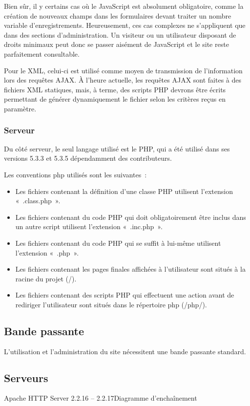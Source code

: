 \documentclass[letter, 11pt]{report}
\begin{document}
Bien sûr, il y certains cas où le JavaScript est absolument obligatoire, comme la création de nouveaux champs dans les formulaires devant traiter un nombre variable d'enregistrements. Heureusement, ces cas complexes ne s'appliquent que dans des sections d'administration. Un visiteur ou un utilisateur disposant de droits minimaux peut donc se passer aisément de JavaScript et le site reste parfaitement consultable.

Pour le XML, celui-ci est utilisé comme moyen de transmission de l'information lors des requêtes AJAX. À l'heure actuelle, les requêtes AJAX sont faites à des fichiers XML statiques, mais, à terme, des scripts PHP devrons être écrits permettant de générer dynamiquement le fichier selon les critères reçus en paramètre.

\subsubsection{Serveur}
Du côté serveur, le seul langage utilisé est le PHP, qui a été utilisé dans ses versions 5.3.3 et 5.3.5 dépendamment des contributeurs.

Les conventions php utilisés sont les suivantes~:

\begin{itemize}
	\item Les fichiers contenant la définition d'une classe PHP utilisent l'extension «~.class.php~».
	\item Les fichiers contenant du code PHP qui doit obligatoirement être inclus dans un autre script utilisent l'extension «~.inc.php~».
	\item Les fichiers contenant du code PHP qui se suffit à lui-même utilisent l'extension «~.php~».
	\item Les fichiers contenant les pages finales affichées à l'utilisateur sont situés à la racine du projet (/).
	\item Les fichiers contenant des scripts PHP qui effectuent une action avant de rediriger l'utilisateur sont situés dans le répertoire php (/php/).
\end{itemize}

\subsection{Bande passante}
L'utilisation et l'administration du site nécessitent une bande passante standard.

\subsection{Serveurs}
Apache HTTP Server 2.2.16 -- 2.2.17Diagramme d'enchaînement
\end{document}
